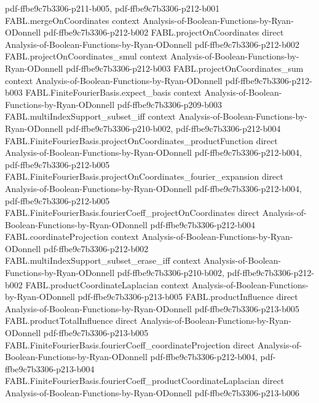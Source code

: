 \begin{theorem}
  {pdf-ffbe9c7b3306-p211-b005,
    pdf-ffbe9c7b3306-p212-b001}
\proofstep
  {FABL.mergeOnCoordinates}
  {context}
  {Analysis-of-Boolean-Functions-by-Ryan-ODonnell}
  {pdf-ffbe9c7b3306-p212-b002}
\proofstep
  {FABL.projectOnCoordinates}
  {direct}
  {Analysis-of-Boolean-Functions-by-Ryan-ODonnell}
  {pdf-ffbe9c7b3306-p212-b002}
\proofstep
  {FABL.projectOnCoordinates_smul}
  {context}
  {Analysis-of-Boolean-Functions-by-Ryan-ODonnell}
  {pdf-ffbe9c7b3306-p212-b003}
\proofstep
  {FABL.projectOnCoordinates_sum}
  {context}
  {Analysis-of-Boolean-Functions-by-Ryan-ODonnell}
  {pdf-ffbe9c7b3306-p212-b003}
\proofstep
  {FABL.FiniteFourierBasis.expect_basis}
  {context}
  {Analysis-of-Boolean-Functions-by-Ryan-ODonnell}
  {pdf-ffbe9c7b3306-p209-b003}
\proofstep
  {FABL.multiIndexSupport_subset_iff}
  {context}
  {Analysis-of-Boolean-Functions-by-Ryan-ODonnell}
  {pdf-ffbe9c7b3306-p210-b002,
    pdf-ffbe9c7b3306-p212-b004}
\proofstep
  {FABL.FiniteFourierBasis.projectOnCoordinates_productFunction}
  {direct}
  {Analysis-of-Boolean-Functions-by-Ryan-ODonnell}
  {pdf-ffbe9c7b3306-p212-b004,
    pdf-ffbe9c7b3306-p212-b005}
\proofstep
  {FABL.FiniteFourierBasis.projectOnCoordinates_fourier_expansion}
  {direct}
  {Analysis-of-Boolean-Functions-by-Ryan-ODonnell}
  {pdf-ffbe9c7b3306-p212-b004,
    pdf-ffbe9c7b3306-p212-b005}
\proofstep
  {FABL.FiniteFourierBasis.fourierCoeff_projectOnCoordinates}
  {direct}
  {Analysis-of-Boolean-Functions-by-Ryan-ODonnell}
  {pdf-ffbe9c7b3306-p212-b004}
\proofstep
  {FABL.coordinateProjection}
  {context}
  {Analysis-of-Boolean-Functions-by-Ryan-ODonnell}
  {pdf-ffbe9c7b3306-p212-b002}
\proofstep
  {FABL.multiIndexSupport_subset_erase_iff}
  {context}
  {Analysis-of-Boolean-Functions-by-Ryan-ODonnell}
  {pdf-ffbe9c7b3306-p210-b002,
    pdf-ffbe9c7b3306-p212-b002}
\proofstep
  {FABL.productCoordinateLaplacian}
  {context}
  {Analysis-of-Boolean-Functions-by-Ryan-ODonnell}
  {pdf-ffbe9c7b3306-p213-b005}
\proofstep
  {FABL.productInfluence}
  {direct}
  {Analysis-of-Boolean-Functions-by-Ryan-ODonnell}
  {pdf-ffbe9c7b3306-p213-b005}
\proofstep
  {FABL.productTotalInfluence}
  {direct}
  {Analysis-of-Boolean-Functions-by-Ryan-ODonnell}
  {pdf-ffbe9c7b3306-p213-b005}
\proofstep
  {FABL.FiniteFourierBasis.fourierCoeff_coordinateProjection}
  {direct}
  {Analysis-of-Boolean-Functions-by-Ryan-ODonnell}
  {pdf-ffbe9c7b3306-p212-b004,
    pdf-ffbe9c7b3306-p213-b004}
\proofstep
  {FABL.FiniteFourierBasis.fourierCoeff_productCoordinateLaplacian}
  {direct}
  {Analysis-of-Boolean-Functions-by-Ryan-ODonnell}
  {pdf-ffbe9c7b3306-p213-b006}
\proofstep

\end{theorem}

